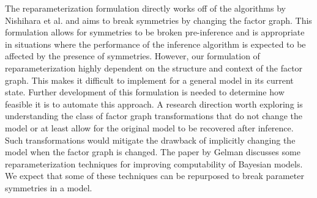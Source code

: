 The reparameterization formulation directly works off of the algorithms by Nishihara et al. and aims to break symmetries by changing the factor graph. This formulation allows for symmetries to be broken pre-inference and is appropriate in situations where the performance of the inference algorithm is expected to be affected by the presence of symmetries. However, our formulation of reparameterization highly dependent on the structure and context of the factor graph. This makes it difficult to implement for a general model in its current state. Further development of this formulation is needed to determine how feasible it is to automate this approach. A research direction worth exploring is understanding the class of factor graph transformations that do not change the model or at least allow for the original model to be recovered after inference. Such transformations would mitigate the drawback of implicitly changing the model when the factor graph is changed. The paper by Gelman \cite{Gelman:2004} discusses some reparameterization techniques for improving computability of Bayesian models. We expect that some of these techniques can be repurposed to break parameter symmetries in a model.